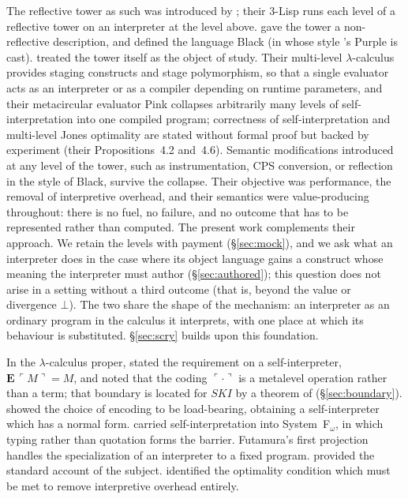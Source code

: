 \documentclass[review]{jfp-epi}
\begin{document}
The reflective tower as such was introduced by \citet{Smith1984}; their 3-Lisp runs each
level of a reflective tower on an interpreter at the level above.
\citet{WandFriedman1988} gave the tower a non-reflective description, and
\citet{Asai1996} defined the language Black (in whose style
\citeauthor{AminRompf2018}'s Purple is cast).  \citet{AminRompf2018}
treated the tower itself as the object of study.
Their multi-level $\lambda$-calculus provides staging constructs and
stage polymorphism, so that a single evaluator acts as an
interpreter or as a compiler depending on runtime parameters, and their
metacircular evaluator Pink collapses arbitrarily many levels of
self-interpretation into one compiled program; correctness of
self-interpretation and multi-level Jones optimality are stated without
formal proof but backed by experiment (their Propositions~4.2 and~4.6).
Semantic modifications introduced at any level of the tower, such as
instrumentation, CPS conversion, or reflection in the style of Black,
survive the collapse. Their objective was performance, the removal of
interpretive overhead, and their semantics were value-producing throughout:
there is no fuel, no failure, and no outcome that has to be represented
rather than computed. The present work complements their approach. We
retain the levels with payment (\S\ref{sec:mock}), and we ask what an
interpreter does in the case where its object language gains a construct
whose meaning the interpreter must author (\S\ref{sec:authored}); this
question does not arise in a setting without a third outcome (that is,
beyond the value or divergence $\bot$). The two
share the shape of the mechanism:  an interpreter as an ordinary program
in the calculus it interprets, with one place at which its behaviour is
substituted.  \S\ref{sec:scry} builds upon this foundation.

In the $\lambda$-calculus proper, \citet{Barendregt1991} stated the
requirement on a self-interpreter, $\mathbf{E}\,\ulcorner M\urcorner = M$,
and noted that the coding $\ulcorner\cdot\urcorner$ is a metalevel
operation rather than a term; that boundary is located for $SKI$ by
a theorem of \citet{JayGivenWilson2011} (\S\ref{sec:boundary}).
\citet{BerarducciBohm1993} showed the
choice of encoding to be load-bearing, obtaining a self-interpreter
which has a normal form. \citet{BrownPalsberg2016} carried
self-interpretation into System~F$_\omega$, in which typing rather than
quotation forms the barrier. Futamura's first projection
\citep{Futamura1971} handles the specialization of an interpreter to a
fixed program. \citet{JonesGomardSestoft1993} provided the standard
account of the subject. \citet{Jones1996} identified the optimality
condition which must be met to remove interpretive
overhead entirely.
\end{document}
